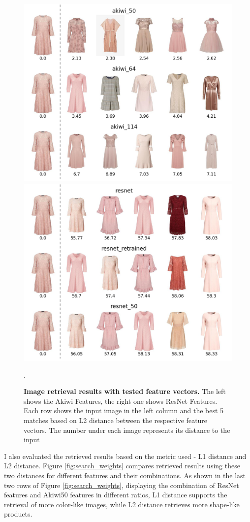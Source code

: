 \documentclass[12pt]{report}
\begin{document}
\begin{figure}[h]
\centering
{\includegraphics[width=.48\linewidth]{04_experiments/retrieval/akiwi_pink}}\hspace{0.2cm}
{\includegraphics[width=.48\linewidth]{04_experiments/retrieval/resnet_pink}}
\caption{\label{fig:search_pink} \textbf{Image retrieval results with tested feature vectors.} The left shows the Akiwi Features, the right one shows ResNet Features. Each row shows the input image in the left column and the best 5 matches based on L2 distance between the respective feature vectors. The number under each image represents its distance to the input}.
\end{figure}

\pagebreak
I also evaluated the retrieved results based on the metric used - L1 distance and L2 distance. Figure \ref{fig:search_weights} compares retrieved results  using these two distances for different features and their combinations. As shown in the last two rows of Figure \ref{fig:search_weights}, displaying the combination of ResNet features and Akiwi50 features in different ratios, L1 distance supports the retrieval of more color-like images, while L2 distance retrieves more shape-like products. 
\end{document}
